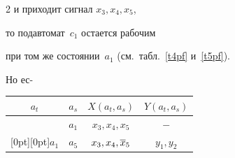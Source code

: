 \begin{multicols}{2}
и приходит сигнал $x_3,x_4,x_5$, %


 то подавтомат~$c_1$ остается рабочим


при том же со\-сто\-янии~$a_1$ (см.\ табл.~\ref{t4pf} и~\ref{t5pf}).


Но ес-\linebreak\vspace*{-12pt}


\pagebreak





\end{multicols}





\begin{table}\small %


\begin{center}


\begin{minipage}[t]{190pt}






\vspace*{2ex}


\vspace*{10pt}





\tabcolsep=12pt


\begin{tabular}{|c|c|c|c|}


\hline


$a_t$ & $a_s$ & $X(a_t,a_s)$ & $Y(a_t,a_s)$ \\




\hline


& $a_1$ & $x_3,x_4,x_5$ & $-$\\






\multicolumn{1}{|c|}{\raisebox{-6pt}[0pt][0pt]{$a_1$}}  & $a_5$ & $x_3,x_4,\overline x_5$ & $y_1,y_2$\\



\end{tabular}
\end{minipage}
\end{center}
\end{table}
